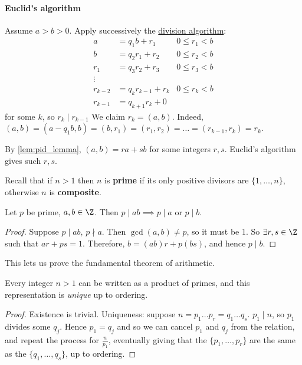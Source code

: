 \documentclass{article}
\begin{document}
\paragraph{Euclid's algorithm}
Assume $a > b > 0$. Apply successively the \hyperlink{def:divisionAlg}{division algorithm}:
\begin{align*}
    a &= q_1 b + r_1 & 0 \leq r_1 < b\\
    b &= q_2 r_1 + r_2 & 0 \leq r_2 < b\\
    r_1 &= q_3 r_2 + r_3 & 0 \leq r_3 < b\\
    \vdots \\
    r_{k-2} &= q_k r_{k-1} + r_k & 0 \leq r_k < b\\
    r_{k-1} &= q_{k+1} r_k + 0
\end{align*}
for some $k$, so $r_k \mid r_{k-1}$
We claim $r_k = (a, b)$. Indeed, $(a, b) = (a - q_1 b, b) = (b, r_1) = (r_1, r_2) = \dots = (r_{k-1}, r_k) = r_k$.
\begin{remark}
     By \cref{lem:pid_lemma}, $(a, b) = r a + s b$ for some integers $r, s$. Euclid's algorithm gives such $r, s$.
\end{remark}

Recall that if $n > 1$ then $n$ is \textbf{prime} if its only positive divisors are $\{1, \dots, n\}$, otherwise $n$ is \textbf{composite}.
\begin{nlemma}
    Let $p$ be prime, $a, b \in \Z$.  Then $p \mid ab \implies p \mid a$ or $p \mid b$.
\end{nlemma}

\begin{proof}
    Suppose $p \mid ab$, $p \nmid a$. Then $\gcd(a, b) \ne p$, so it must be $1$. So $\exists r, s \in \Z$ such that $ar + ps = 1$.
    Therefore, $b = (ab) r + p(bs)$, and hence $p \mid b$.
\end{proof}

This lets us prove the fundamental theorem of arithmetic.
\begin{thm}
    Every integer $n > 1$ can be written as a product of primes, and this representation is \emph{unique} up to ordering.
\end{thm}
\begin{proof}
    Existence is trivial. Uniqueness: suppose $n = p_1 \dots p_r = q_1 \dots q_s$. $p_1 \mid n$, so $p_1$ divides some $q_j$. Hence $p_1 = q_j$ and so we can cancel $p_1$ and $q_j$ from the relation, and repeat the process for $\frac{n}{p_1}$, eventually giving that the $\{p_1, \dots, p_r\}$ are the same as the $\{q_1, \dots, q_s\}$, up to ordering.
\end{proof}
\end{document}
